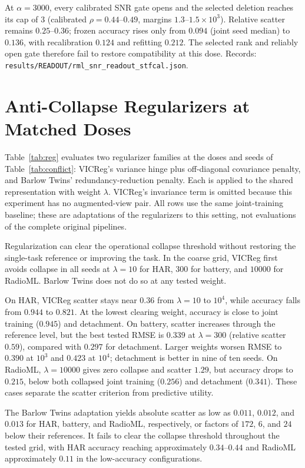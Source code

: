 \documentclass{article}
\begin{document}
At $\alpha=3000$, every calibrated SNR gate opens and the selected deletion reaches its cap of $3$ (calibrated $\rho=0.44$--$0.49$, margins $1.3$--$1.5\times10^3$). Relative scatter remains $0.25$--$0.36$; frozen accuracy rises only from $0.094$ (joint seed median) to $0.136$, with recalibration $0.124$ and refitting $0.212$. The selected rank and reliably open gate therefore fail to restore compatibility at this dose. Records: \texttt{results/READOUT/rml\_snr\_readout\_stfcal.json}.

\section{Anti-Collapse Regularizers at Matched Doses}\label{app:reg}

Table~\ref{tab:reg} evaluates two regularizer families at the doses and seeds of Table~\ref{tab:conflict}: VICReg's variance hinge plus off-diagonal covariance penalty, and Barlow Twins' redundancy-reduction penalty. Each is applied to the shared representation with weight $\lambda$. VICReg's invariance term is omitted because this experiment has no augmented-view pair. All rows use the same joint-training baseline; these are adaptations of the regularizers to this setting, not evaluations of the complete original pipelines.

Regularization can clear the operational collapse threshold without restoring the single-task reference or improving the task. In the coarse grid, VICReg first avoids collapse in all seeds at $\lambda=10$ for HAR, $300$ for battery, and $10000$ for RadioML. Barlow Twins does not do so at any tested weight.

On HAR, VICReg scatter stays near $0.36$ from $\lambda=10$ to $10^4$, while accuracy falls from $0.944$ to $0.821$. At the lowest clearing weight, accuracy is close to joint training ($0.945$) and detachment. On battery, scatter increases through the reference level, but the best tested RMSE is $0.339$ at $\lambda=300$ (relative scatter $0.59$), compared with $0.297$ for detachment. Larger weights worsen RMSE to $0.390$ at $10^3$ and $0.423$ at $10^4$; detachment is better in nine of ten seeds. On RadioML, $\lambda=10000$ gives zero collapse and scatter $1.29$, but accuracy drops to $0.215$, below both collapsed joint training ($0.256$) and detachment ($0.341$). These cases separate the scatter criterion from predictive utility.

The Barlow Twins adaptation yields absolute scatter as low as $0.011$, $0.012$, and $0.013$ for HAR, battery, and RadioML, respectively, or factors of $172$, $6$, and $24$ below their references. It fails to clear the collapse threshold throughout the tested grid, with HAR accuracy reaching approximately $0.34$--$0.44$ and RadioML approximately $0.11$ in the low-accuracy configurations.
\end{document}
